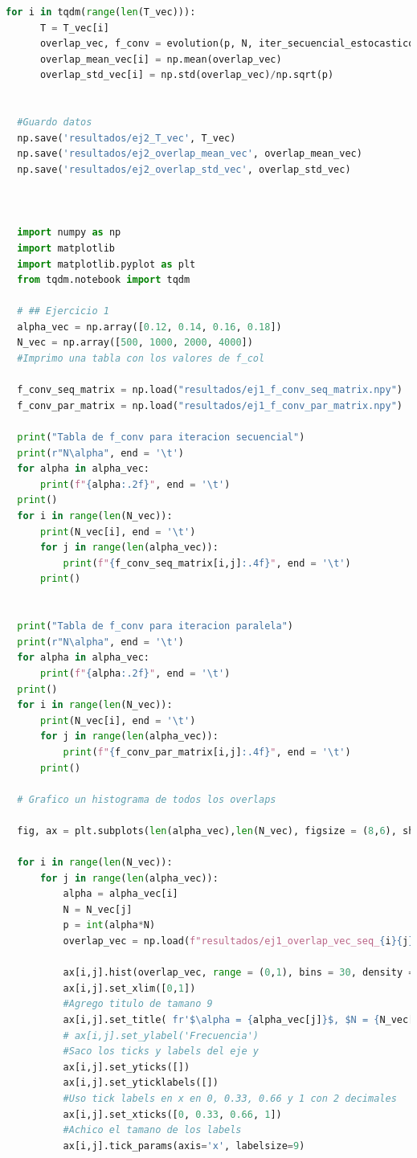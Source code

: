 \documentclass[aps,prb,twocolumn,superscriptaddress,floatfix,longbibliography]{revtex4-2}
\newcounter{para}
\begin{document}
\begin{lstlisting}[language=Python]
  for i in tqdm(range(len(T_vec))):
      T = T_vec[i]
      overlap_vec, f_conv = evolution(p, N, iter_secuencial_estocastico, overlap_estocastico, T = T, N_iter = 10, calculate_all = False)
      overlap_mean_vec[i] = np.mean(overlap_vec)
      overlap_std_vec[i] = np.std(overlap_vec)/np.sqrt(p)
  
  
  #Guardo datos
  np.save('resultados/ej2_T_vec', T_vec)
  np.save('resultados/ej2_overlap_mean_vec', overlap_mean_vec)
  np.save('resultados/ej2_overlap_std_vec', overlap_std_vec)
  
  
  
  import numpy as np
  import matplotlib
  import matplotlib.pyplot as plt
  from tqdm.notebook import tqdm
  
  # ## Ejercicio 1
  alpha_vec = np.array([0.12, 0.14, 0.16, 0.18])
  N_vec = np.array([500, 1000, 2000, 4000])
  #Imprimo una tabla con los valores de f_col
  
  f_conv_seq_matrix = np.load("resultados/ej1_f_conv_seq_matrix.npy")
  f_conv_par_matrix = np.load("resultados/ej1_f_conv_par_matrix.npy")
  
  print("Tabla de f_conv para iteracion secuencial")
  print(r"N\alpha", end = '\t')
  for alpha in alpha_vec:
      print(f"{alpha:.2f}", end = '\t')
  print()
  for i in range(len(N_vec)):
      print(N_vec[i], end = '\t')
      for j in range(len(alpha_vec)):
          print(f"{f_conv_seq_matrix[i,j]:.4f}", end = '\t')
      print()
  
  
  print("Tabla de f_conv para iteracion paralela")
  print(r"N\alpha", end = '\t')
  for alpha in alpha_vec:
      print(f"{alpha:.2f}", end = '\t')
  print()
  for i in range(len(N_vec)):
      print(N_vec[i], end = '\t')
      for j in range(len(alpha_vec)):
          print(f"{f_conv_par_matrix[i,j]:.4f}", end = '\t')
      print()
  
  # Grafico un histograma de todos los overlaps
  
  fig, ax = plt.subplots(len(alpha_vec),len(N_vec), figsize = (8,6), sharex=True, sharey=True)
  
  for i in range(len(N_vec)):
      for j in range(len(alpha_vec)):
          alpha = alpha_vec[i]
          N = N_vec[j]
          p = int(alpha*N)
          overlap_vec = np.load(f"resultados/ej1_overlap_vec_seq_{i}{j}.npy")
  
          ax[i,j].hist(overlap_vec, range = (0,1), bins = 30, density = True)
          ax[i,j].set_xlim([0,1])
          #Agrego titulo de tamano 9
          ax[i,j].set_title( fr'$\alpha = {alpha_vec[j]}$, $N = {N_vec[i]}$', fontsize = 9)
          # ax[i,j].set_ylabel('Frecuencia')
          #Saco los ticks y labels del eje y
          ax[i,j].set_yticks([])
          ax[i,j].set_yticklabels([])
          #Uso tick labels en x en 0, 0.33, 0.66 y 1 con 2 decimales
          ax[i,j].set_xticks([0, 0.33, 0.66, 1])
          #Achico el tamano de los labels
          ax[i,j].tick_params(axis='x', labelsize=9)
          

\end{lstlisting}
\end{document}
